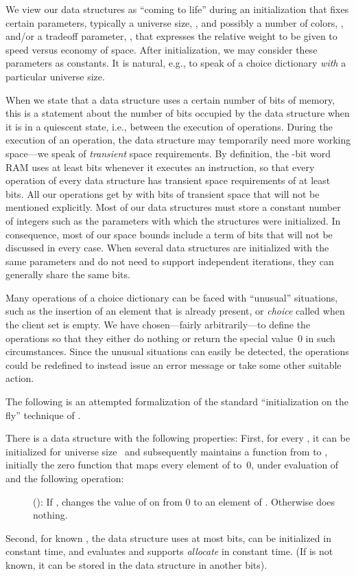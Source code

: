\documentclass[envcountsame,envcountsect,undated,nolinenumbers]{lnthi}
\def\Tvn#1{\hbox{\textit{#1\/}}}
\begin{document}
We view our data structures as
``coming to life'' during an initialization that
fixes certain parameters, typically a
universe size, , and possibly a number
of colors, , and/or a tradeoff parameter, ,
that expresses the relative weight to be given
to speed versus economy of space.
After initialization, we may consider these
parameters as constants.
It is natural, e.g., to speak of a choice
dictionary \emph{with} a particular universe size.

When we state that a data structure uses a certain
number of bits of memory, this is a statement about
the number of bits occupied by the data structure
when it is in a quiescent state, i.e., between the
execution of operations.
During the execution of an operation, the data structure
may temporarily need more working space---we speak
of \emph{transient} space requirements.
By definition, the -bit word RAM uses at least
 bits whenever it executes an instruction,
so that every operation of every data structure
has transient space requirements of at least
 bits.
All our operations
get by with  bits of transient space
that will not be mentioned explicitly.
Most of our data structures must store a
constant number of integers such as the parameters
with which the structures were initialized.
In consequence, most of our space bounds include
a term of  bits that will not be
discussed in every case.
When several data structures are initialized with
the same parameters and do not need to support
independent iterations, they can generally share the
same  bits.

Many operations of a choice dictionary can be faced
with ``unusual'' situations, such as the insertion of
an element that is already present, or \Tvn{choice}
called when the client set is empty.
We have chosen---fairly arbitrarily---to define the
operations so that they either do nothing or return
the special value~0 in such circumstances.
Since the unusual situations can easily be detected,
the operations could be redefined to instead issue an
error message or take some other suitable action.

The following is an attempted formalization
of the standard
``initialization on the fly''
technique of \cite[Exercise 2.12]{AhoHU74}.

\begin{lemma}
\label{lem:2.12}There is a data structure with the following
properties:
First, for every , it can be
initialized for universe size~ and
subsequently maintains
a function  from
 to ,
initially the zero function that maps every
element of  to~0,
under evaluation of 
and the following operation:

\begin{description}
\item[\normalfont]
():
If ,
changes the value of  on  from 0 to
an element of .
Otherwise does nothing.
\end{description}

\noindent
Second, for known , the data structure uses at most
 bits, can be initialized
in constant time, and evaluates  and
supports \Tvn{allocate} in constant time.
(If  is not known, it can be stored in the
data structure in another  bits).
\end{lemma}
\end{document}
